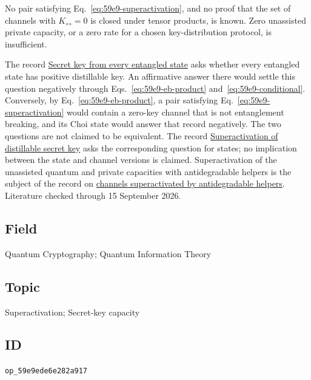 No pair satisfying Eq.~\eqref{eq:59e9-superactivation}, and no proof that
the set of channels with $K_{\leftrightarrow}=0$ is closed under tensor
products, is known.  Zero unassisted private capacity, or a zero rate for a
chosen key-distribution protocol, is insufficient.

The record \href{https://qiqc-op.com/problem/op_b952ec2dd8246a10/}{Secret key
from every entangled state} asks whether every entangled state has positive
distillable key.  An affirmative answer there would settle this question
negatively through Eqs.~\eqref{eq:59e9-eb-product}
and~\eqref{eq:59e9-conditional}.  Conversely, by
Eq.~\eqref{eq:59e9-eb-product}, a pair satisfying
Eq.~\eqref{eq:59e9-superactivation} would contain a zero-key channel that is
not entanglement breaking, and its Choi state would answer that record
negatively.  The two questions are not claimed to be equivalent.  The record
\href{https://qiqc-op.com/problem/op_3be0df761e83d438/}{Superactivation of
distillable secret key} asks the corresponding question for states; no
implication between the state and channel versions is claimed.  Superactivation of the unassisted quantum and private capacities with
antidegradable helpers is the subject of the record on
\href{https://qiqc-op.com/problem/op_c45752aeb9a106bc/}{channels superactivated by antidegradable helpers}.
Literature checked through 15 September 2026.

\subsection*{Field}

Quantum Cryptography; Quantum Information Theory

\subsection*{Topic}

Superactivation; Secret-key capacity

\subsection*{ID}

\texttt{op\_59e9ede6e282a917}
